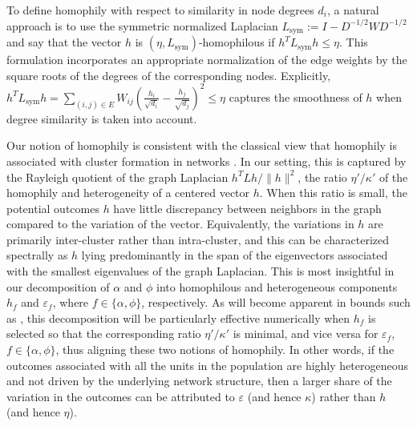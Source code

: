 \documentclass[12pt]{article}
\theoremstyle{definition}
\numberwithin{equation}{section}
\numberwithin{figure}{section}
\numberwithin{equation}{section}
\numberwithin{figure}{section}
\begin{document}
\begin{remark} \label{remark_homophily_lapsym}

To define homophily with respect to similarity in node degrees $d_i$, a natural approach is to use the symmetric normalized Laplacian $L_{\text{sym}} := I - D^{-1/2}WD^{-1/2}$ and say that the vector $h$ is $(\eta, L_{\text{sym}})$-homophilous if $h^TL_{\text{sym}}h \leq \eta$. 
This formulation incorporates an appropriate normalization of the edge weights by the square roots of the degrees of the corresponding nodes. Explicitly, $h^TL_{\text{sym}}h = \sum_{(i,j) \in E} W_{ij} \left( \frac{h_i}{\sqrt{d_i}} - \frac{h_j}{\sqrt{d_j}}\right)^2 \leq \eta$ captures the smoothness of $h$ when degree similarity is taken into account. 
\end{remark}

\begin{remark} \label{remark_homophily_clustering}
Our notion of homophily is consistent with the classical view that homophily is associated with cluster formation in networks \citep{mcpherson2001birds, currarini2009economic,jackson2023dynamics, jackson2025inequality}. In our setting, this is captured by the Rayleigh quotient of the graph Laplacian $h^T L h/\|h\|^2$, the ratio $\eta'/\kappa'$ of the homophily and heterogeneity of a centered vector $h$. When this ratio is small, the potential outcomes $h$ have little discrepancy between neighbors in the graph compared to the variation 
of the vector. Equivalently, the variations  in $h$ are primarily inter-cluster rather than intra-cluster, and this can be characterized spectrally as $h$ lying predominantly in the span of the eigenvectors associated with the smallest eigenvalues of the graph Laplacian. This is most insightful in our decomposition of $\alpha$ and $\phi$ into homophilous and heterogeneous components $h_f$ and $\varepsilon_f$, where $f \in \{\alpha, \phi \}$, respectively. As will become apparent in bounds such as , this decomposition will be particularly effective numerically when $h_f$ is selected so that the corresponding ratio $\eta'/\kappa'$ is minimal, and vice versa for $\varepsilon_f$, $f \in \{\alpha, \phi\}$, thus aligning these two notions of homophily. In other words, if the outcomes associated with all the units in the population are highly heterogeneous and not driven by the underlying network structure, then a larger share of the variation in the outcomes can be attributed to $\varepsilon$ (and hence $\kappa$) rather than $h$ (and hence $\eta$).
\end{remark}
\end{document}
